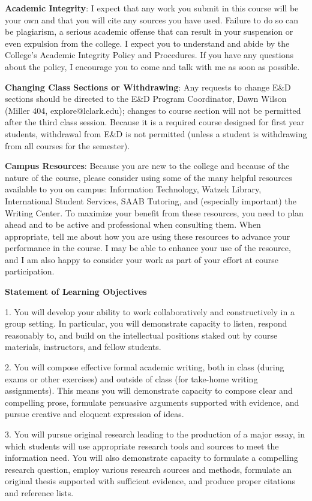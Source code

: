 \documentclass[10pt,preprint]{aastex}
\begin{document}
\textbf{Academic Integrity}: I expect that any work you submit in this course will be your own and that you will cite any sources you have used. Failure to do so can be plagiarism, a serious academic offense that can result in your suspension or even expulsion from the college. I expect you to understand and abide by the College’s Academic Integrity Policy and Procedures.  If you have any questions about the policy, I encourage you to come and talk with me as soon as possible. 

\textbf{Changing Class Sections or Withdrawing}: Any requests to change E\&D sections should be directed to the E\&D Program Coordinator, Dawn Wilson (Miller 404, explore@lclark.edu); changes to course section will not be permitted after the third class session.  Because it is a required course designed for first year students, withdrawal from E\&D is not permitted (unless a student is withdrawing from all courses for the semester).

\textbf{Campus Resources}: Because you are new to the college and because of the nature of the course, please consider using some of the many helpful resources available to you on campus: Information Technology, Watzek Library, International Student Services, SAAB Tutoring, and (especially important) the Writing Center.  To maximize your benefit from these resources, you need to plan ahead and to be active and professional when consulting them.  When appropriate, tell me about how you are using these resources to advance your performance in the course.  I may be able to enhance your use of the resource, and I am also happy to consider your work as part of your effort at course participation.

\textbf{Statement of Learning Objectives}

1.	You will develop your ability to work collaboratively and constructively in a group setting.  In particular, you will demonstrate capacity to listen, respond reasonably to, and build on the intellectual positions staked out by course materials, instructors, and fellow students.

2.	You will compose effective formal academic writing, both in class (during exams or other exercises) and outside of class (for take-home writing assignments).  This means you will demonstrate capacity to compose clear and compelling prose, formulate persuasive arguments supported with evidence, and pursue creative and eloquent expression of ideas.

3.	You will pursue original research leading to the production of a major essay, in which students will use appropriate research tools and sources to meet the information need.
You will also demonstrate capacity to formulate a compelling research question, employ various research sources and methods, formulate an original thesis supported with sufficient evidence, and produce proper citations and reference lists.
\end{document}
